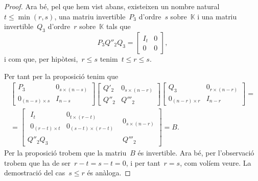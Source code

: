\documentclass[../algebra-lineal.tex]{subfiles}
\begin{document}
\begin{proof}
        Ara bé, pel que hem vist abans, existeixen un nombre natural~\(t\leq\min(r,s)\), una matriu invertible~\(P_{3}\) d'ordre~\(s\) sobre~\(\mathbb{K}\) i una matriu invertible~\(Q_{3}\) d'ordre~\(r\) sobre~\(\mathbb{K}\) tals que
        \[P_{3}Q''_{2}Q_{3}=\left[\begin{array}{c|c}
        I_{t} & 0 \\\hline
        0 & 0
        \end{array}\right],\]
        i com que, per hipòtesi,~\(r\leq s\) tenim~\(t\leq r\leq s\).

        Per tant per la proposició  tenim que
        \begin{multline*}
        \left[\begin{array}{c|c}
        P_{3} & 0_{s\times(n-s)} \\\hline
        0_{(n-s)\times s} & I_{n-s}
        \end{array}\right]
        \left[\begin{array}{c|c}
        Q'_{2} & 0_{s\times(n-r)} \\\hline
        Q''_{2} & Q'''_{2}
        \end{array}\right]
        \left[\begin{array}{c|c}
        Q_{3} & 0_{r\times(n-r)} \\\hline
        0_{(n-r)\times r} & I_{n-r}
        \end{array}\right]=\\=
        \left[\begin{array}{c|c}
            \begin{array}{c|c}
            I_{t} & 0_{t\times(r-t)} \\\hline
            0_{(r-t)\times t} & 0_{(s-t)\times(r-t)}
            \end{array}
        & 0_{s\times(n-r)} \\\hline
        Q''_{2}Q_{3} & Q'''_{2}
        \end{array}\right]=B.
        \end{multline*}
        Per la proposició  trobem que la matriu~\(B\) és invertible.
        Ara bé, per l'observació  trobem que ha de ser~\(r-t=s-t=0\), i per tant~\(r=s\), com volíem veure.
        La demostració del cas~\(s\leq r\) és anàloga.
    \end{proof}
\end{document}
